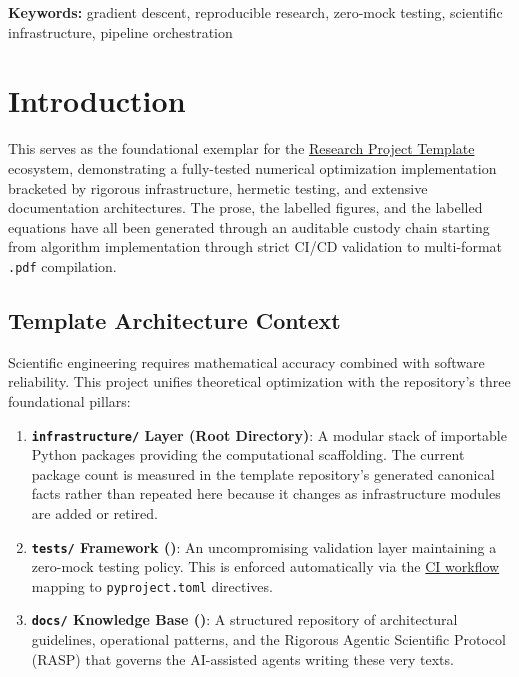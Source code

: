 \documentclass[
]{article}
\providecommand{\tightlist}{%
  \setlength{\itemsep}{0pt}\setlength{\parskip}{0pt}}
\begin{document}
\textbf{Keywords:} gradient descent, reproducible research, zero-mock
testing, scientific infrastructure, pipeline orchestration

\newpage

\section{Introduction}\label{sec:introduction}

This  serves as the foundational
exemplar for the \href{https://github.com/docxology/template}{Research
Project Template} ecosystem, demonstrating a fully-tested numerical
optimization implementation bracketed by rigorous infrastructure,
hermetic testing, and extensive documentation architectures. The prose,
the labelled figures, and the labelled equations have all been generated
through an auditable custody chain starting from algorithm
implementation through strict CI/CD validation to multi-format
\texttt{.pdf} compilation.

\subsection{Template Architecture
Context}\label{template-architecture-context}

Scientific engineering requires mathematical accuracy combined with
software reliability. This project unifies theoretical optimization with
the repository's three foundational pillars:

\begin{enumerate}
\def\labelenumi{\arabic{enumi}.}
\tightlist
\item
  \textbf{\texttt{infrastructure/} Layer (Root Directory)}: A modular
  stack of importable Python packages providing the computational
  scaffolding. The current package count is measured in the template
  repository's generated canonical facts rather than repeated here
  because it changes as infrastructure modules are added or retired.
\item
  \textbf{\texttt{tests/} Framework
  ()}: An uncompromising
  validation layer maintaining a zero-mock testing policy. This is
  enforced automatically via the
  \href{https://github.com/docxology/template/blob/main/.github/workflows/ci.yml}{CI
  workflow} mapping to \texttt{pyproject.toml} directives.
\item
  \textbf{\texttt{docs/} Knowledge Base
  ()}: A structured
  repository of architectural guidelines, operational patterns, and the
  Rigorous Agentic Scientific Protocol (RASP) that governs the
  AI-assisted agents writing these very texts.
\end{enumerate}
\end{document}
